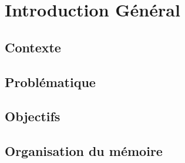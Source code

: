 \chapter*{Introduction Général }
\section*{Contexte} 


\section*{Problématique}


 
\section*{Objectifs}


\section*{Organisation du mémoire}
 